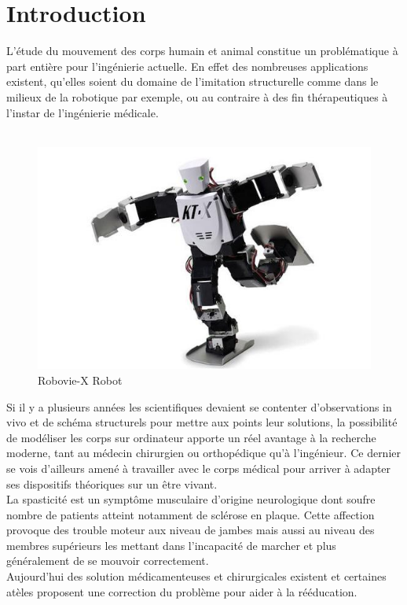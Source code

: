 \chapter{Introduction}
L'étude du mouvement des corps humain et animal constitue un problématique à part entière pour l'ingénierie actuelle. En effet des nombreuses applications existent, qu'elles soient du domaine de l'imitation structurelle comme dans le milieux de la robotique par exemple, ou au contraire à des fin thérapeutiques à l'instar de l'ingénierie médicale.\\ 

\begin{figure}[h!]
    \centering
    \includegraphics[scale = 0.4]{Images/Robot.jpg}
    \caption{Robovie-X Robot \cite{noauthor_robovie-x_nodate}}
    \label{figRobot}
\end{figure}

Si il y a plusieurs années les scientifiques devaient se contenter d'observations in vivo et de schéma structurels pour mettre aux points leur solutions, la possibilité de modéliser les corps sur ordinateur apporte un réel avantage à la recherche moderne, tant au médecin chirurgien ou orthopédique qu'à l'ingénieur. Ce dernier se vois d'ailleurs amené à travailler avec le corps médical pour arriver à adapter ses dispositifs théoriques sur un être vivant.\\

La spasticité est un symptôme musculaire d'origine neurologique dont soufre nombre de patients atteint notamment de sclérose en plaque. Cette affection provoque des trouble moteur aux niveau de jambes mais aussi au niveau des membres supérieurs les mettant dans l'incapacité de marcher et plus généralement de se mouvoir correctement.\\
Aujourd'hui des solution médicamenteuses et chirurgicales existent et certaines atèles proposent une correction du problème pour aider à la rééducation.\\

